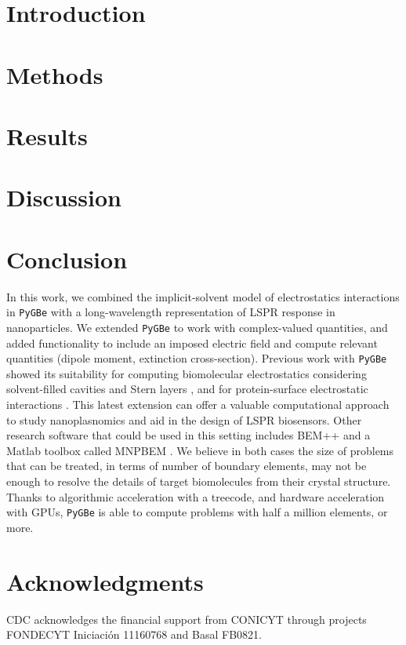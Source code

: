 \documentclass[final,5p,times,twocolumn]{elsarticle}
\newcommand{\pygbe}{\texttt{PyGBe}\xspace}
\begin{document}

\section{Introduction}\label{sec:intro}


\section{Methods}\label{sec:methods}
 

\section{Results} \label{sec:results}


\section{Discussion} \label{sec:discussion}


\section{Conclusion}
%

In this work, we combined the implicit-solvent model of electrostatics interactions in \pygbe 
with a long-wavelength representation of LSPR response in nanoparticles. 
We extended \pygbe to work with complex-valued quantities, and added functionality to 
include an imposed electric field and compute relevant quantities 
(dipole moment, extinction cross-section). 
Previous work with \pygbe showed its suitability for computing 
biomolecular electrostatics considering solvent-filled cavities and Stern layers \cite{CooperBardhanBarba2013}, 
and for protein-surface electrostatic interactions \cite{CooperBarba2016}.
This latest extension can offer a valuable computational approach to study nanoplasnomics and aid in the design of LSPR biosensors. 
Other research software that could be used in this setting includes  
BEM++ \cite{SmigajETal2015} and a Matlab toolbox called MNPBEM \cite{HohenesterTrugler2012}. 
We believe in both cases the size of problems that can be treated, in terms of number of boundary elements, may not be enough to resolve the details of target biomolecules from their crystal structure. 
Thanks to algorithmic acceleration with a treecode, and hardware acceleration with GPUs, \pygbe is able to compute problems with half a million elements, or more.



\section*{Acknowledgments}

CDC acknowledges the financial support from CONICYT through projects FONDECYT Iniciaci\'on 11160768 and Basal FB0821.


\end{document}
